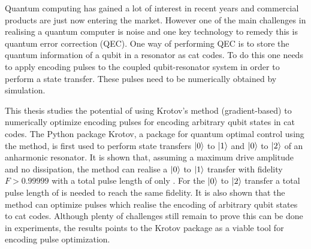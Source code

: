 \documentclass[main.tex]{subfiles}
\begin{document}
Quantum computing has gained a lot of interest in recent years and commercial products are just now entering the market.
However one of the main challenges in realising a quantum computer is noise and one key technology to remedy this is quantum error correction (QEC).
One way of performing QEC is to store the quantum information of a qubit in a resonator as cat codes.
To do this one needs to apply encoding pulses to the coupled qubit-resonator system in order to perform a state transfer.
These pulses need to be numerically obtained by simulation.

This thesis studies the potential of using Krotov's method (gradient-based) to numerically optimize encoding pulses for encoding arbitrary qubit states in cat codes.
The Python package Krotov, a package for quantum optimal control using the method, is first used to perform state transfers \(\ket{0}\) to \(\ket{1}\) and \(\ket{0}\) to \(\ket{2}\) of an anharmonic resonator.
It is shown that, assuming a maximum drive amplitude and no dissipation, the method can realise a \(\ket{0}\) to \(\ket{1}\) transfer with fidelity \( F > 0.99999\) with a total pulse length of only .
For the \(\ket{0}\) to \(\ket{2}\) transfer a total pulse length of  is needed to reach the same fidelity.
It is also shown that the method can optimize pulses which realise the encoding of arbitrary qubit states to cat codes.
Although plenty of challenges still remain to prove this can be done in experiments, the results points to the Krotov package as a viable tool for encoding pulse optimization.
\end{document}
